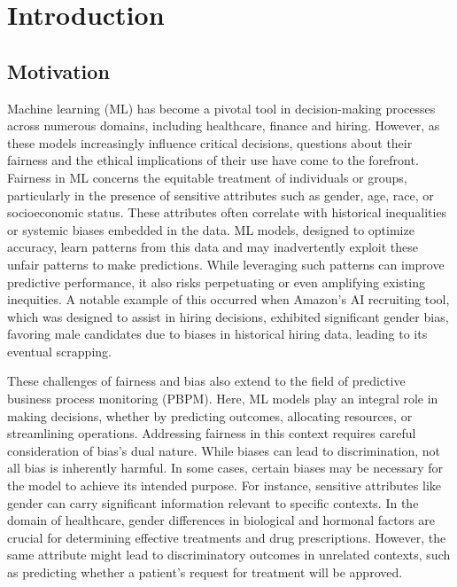 %
\chapter{Introduction}

\section{Motivation}
Machine learning (ML) has become a pivotal tool in decision-making processes across numerous domains,
including healthcare, finance and hiring.
However, as these models increasingly influence critical decisions,
questions about their fairness and the ethical implications of their use have come to the forefront.
Fairness in ML concerns the equitable treatment of individuals or groups,
particularly in the presence of sensitive attributes such as gender, age, race, or socioeconomic status.
These attributes often correlate with historical inequalities or systemic biases embedded in the data.
ML models, designed to optimize accuracy,
learn patterns from this data and may inadvertently exploit these unfair patterns to make predictions.
While leveraging such patterns can improve predictive performance,
it also risks perpetuating or even amplifying existing inequities.
A notable example of this occurred when Amazon's AI recruiting tool,
which was designed to assist in hiring decisions,
exhibited significant gender bias,
favoring male candidates due to biases in historical hiring data,
leading to its eventual scrapping. \cite{amazon_bias}

These challenges of fairness and bias also extend to the field of predictive business process monitoring (PBPM).
Here, ML models play an integral role in making decisions,
whether by predicting outcomes, allocating resources, or streamlining operations.
Addressing fairness in this context requires careful consideration of bias's dual nature.
While biases can lead to discrimination, not all bias is inherently harmful.
In some cases, certain biases may be necessary for the model to achieve its intended purpose.
For instance, sensitive attributes like gender can carry significant information relevant to specific contexts.
In the domain of healthcare, gender differences in biological and hormonal factors
are crucial for determining effective treatments and drug prescriptions.
However, the same attribute might lead to discriminatory outcomes in unrelated contexts,
such as predicting whether a patient's request for treatment will be approved.

